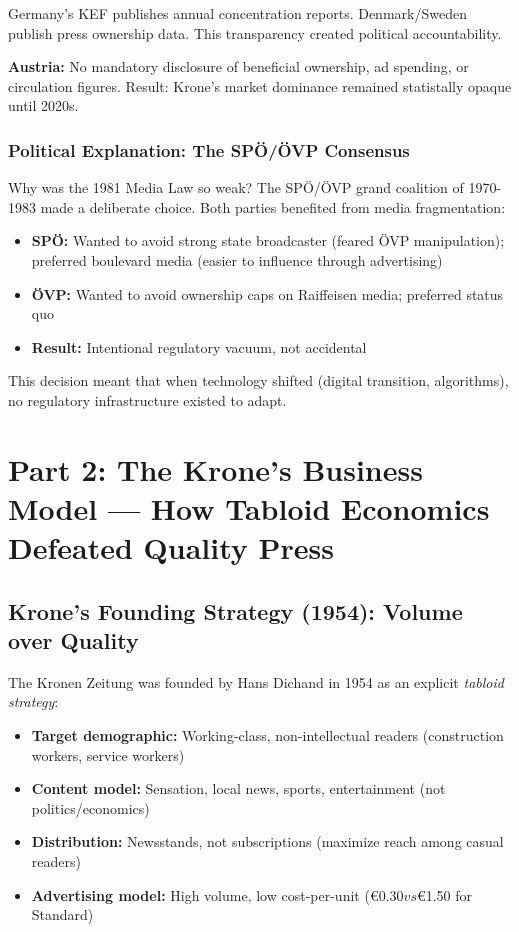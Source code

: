 {Germany's KEF publishes annual concentration reports. Denmark/Sweden publish press ownership data.
This transparency created political accountability.

\textbf{Austria:} No mandatory disclosure of beneficial ownership, ad spending, or circulation figures.
Result: Krone's market dominance remained statistally opaque until 2020s.

\subsubsection*{Political Explanation: The SPÖ/ÖVP Consensus}

Why was the 1981 Media Law so weak? The SPÖ/ÖVP grand coalition of 1970-1983 made a deliberate choice.
Both parties benefited from media fragmentation:

\begin{itemize}
\item \textbf{SPÖ:} Wanted to avoid strong state broadcaster (feared ÖVP manipulation); preferred boulevard
  media (easier to influence through advertising)
\item \textbf{ÖVP:} Wanted to avoid ownership caps on Raiffeisen media; preferred status quo
\item \textbf{Result:} Intentional regulatory vacuum, not accidental
\end{itemize}

This decision meant that when technology shifted (digital transition, algorithms), no regulatory infrastructure
existed to adapt.


\section*{Part 2: The Krone's Business Model --- How Tabloid Economics Defeated Quality Press}

\subsection*{Krone's Founding Strategy (1954): Volume over Quality}

The Kronen Zeitung was founded by Hans Dichand in 1954 as an explicit \textit{tabloid strategy}:

\begin{itemize}
\item \textbf{Target demographic:} Working-class, non-intellectual readers (construction workers, service workers)
\item \textbf{Content model:} Sensation, local news, sports, entertainment (not politics/economics)
\item \textbf{Distribution:} Newsstands, not subscriptions (maximize reach among casual readers)
\item \textbf{Advertising model:} High volume, low cost-per-unit ($€0.30 vs $€1.50 for Standard)
\end{itemize}

}
